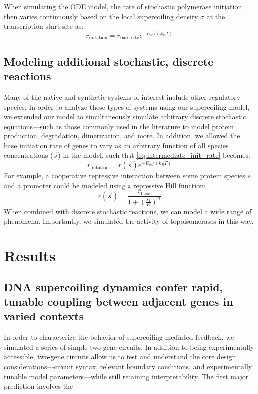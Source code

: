 \documentclass[11pt]{article}
\begin{document}
When simulating the ODE model, the rate of stochastic polymerase initiation then varies continuously based on the local supercoiling density \(\sigma\) at the transcription start site as:
\begin{equation}
    r_\text{initation} = r_\text{base rate} e^{- E_\text{sc} / (k_B T)}
\label{eq:intermediate_init_rate}
\end{equation}


\subsection{Modeling additional stochastic, discrete reactions}
Many of the native and synthetic systems of interest include other regulatory species. In order to analyze these types of systems using our supercoiling model, we extended our model to simultaneously simulate arbitrary discrete stochastic equations---such as those commonly used in the literature to model protein production, degradation, dimerization, and more.
In addition, we allowed the base initiation rate of genes to vary as an arbitrary function of all species concentrations (\(\vec s\)) in the model, such that \cref{eq:intermediate_init_rate} becomes:
\begin{equation}
    r_\text{initation} = r(\vec s) e^{- E_\text{sc} / (k_B T)}
\label{eq:final_init_rate}
\end{equation}
For example, a cooperative repressive interaction between some protein species \(s_1\) and a promoter could be modeled using a repressive Hill function:
\[
    r(\vec s) = \frac{r_\text{base}}{1 + \left(\frac{s_1}{K}\right)^n}
\]
When combined with discrete stochastic reactions, we can model a wide range of phenomena. Importantly, we simulated the activity of topoisomerases in this way.

\section{Results}

\subsection{DNA supercoiling dynamics confer rapid, tunable coupling between adjacent genes in varied contexts}
In order to characterize the behavior of supercoiling-mediated feedback, we simulated a series of simple two-gene circuits. In addition to being experimentally accessible, two-gene circuits allow us to test and understand the core design considerations---circuit syntax, relevant boundary conditions, and experimentally tunable model parameters---while still retaining interpretability.
The first major prediction involves the
\end{document}
